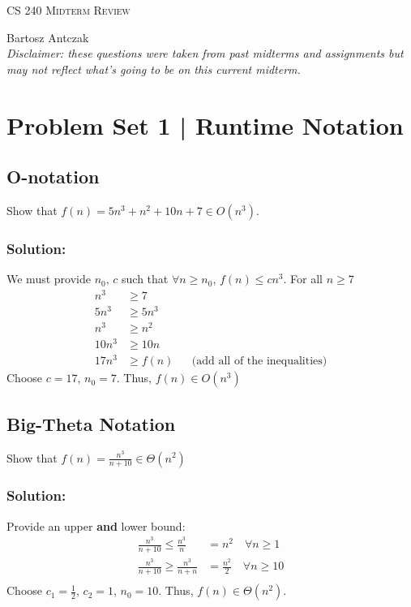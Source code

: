 \documentclass{report}
\begin{document}
\begin{center}
\begin{Large}
\textsc{CS 240 Midterm Review}\\
\end{Large}
Bartosz Antczak\\
\textit{Disclaimer: these questions were taken from past midterms and assignments but may not reflect what's going to be on this current midterm.}
\end{center} 

\section*{Problem Set 1 | Runtime Notation}
\subsection{O-notation}
Show that $f(n) = 5n^3 + n^2 + 10n + 7 \in O(n^3)$.
\subsubsection{Solution:}
We must provide $n_0,\, c$ such that $\forall n \geq n_0$, $f(n) \leq cn^3$. For all $n \geq 7$
\begin{align*}
n^3 &\geq 7 \\
5n^3 &\geq 5n^3 \\
n^3 &\geq n^2 \\
10n^3 &\geq 10n \\
17n^3 &\geq f(n) && \text{(add all of the inequalities)}
\end{align*}
Choose $c = 17, \, n_0 = 7$. Thus, $f(n) \in O(n^3)$
\subsection{Big-Theta Notation}
Show that $f(n) = \frac{n^3}{n + 10} \in \Theta(n^2)$
\subsubsection{Solution:}
Provide an upper \textbf{and} lower bound:
\begin{align*}
\frac{n^3}{n + 10} \leq \frac{n^3}{n} &= n^2 \quad \forall n \geq 1 \\
\frac{n^3}{n+10} \geq \frac{n^3}{n+n} &= \frac{n^2}{2} \quad \forall n \geq 10 \\
\end{align*}
Choose $c_1 = \displaystyle \frac{1}{2}$, $c_2 = 1$, $n_0 = 10$. Thus, $f(n) \in \Theta(n^2)$.
\end{document}
